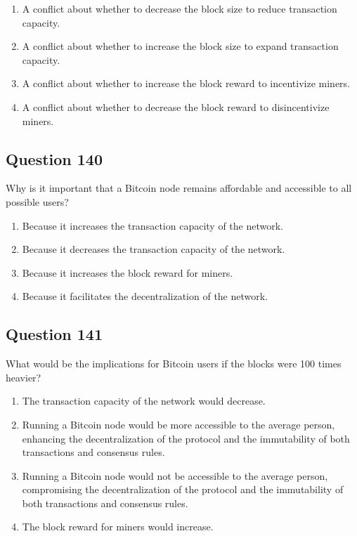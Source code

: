 \documentclass[12pt,a4paper]{article}
\begin{document}
\begin{enumerate}[label=\Alph*., leftmargin=*]
\item A conflict about whether to decrease the block size to reduce transaction capacity.
\item A conflict about whether to increase the block size to expand transaction capacity.
\item A conflict about whether to increase the block reward to incentivize miners.
\item A conflict about whether to decrease the block reward to disincentivize miners.
\end{enumerate}

\bigskip


\subsection*{Question 140}
Why is it important that a Bitcoin node remains affordable and accessible to all possible users?

\begin{enumerate}[label=\Alph*., leftmargin=*]
\item Because it increases the transaction capacity of the network.
\item Because it decreases the transaction capacity of the network.
\item Because it increases the block reward for miners.
\item Because it facilitates the decentralization of the network.
\end{enumerate}

\bigskip


\subsection*{Question 141}
What would be the implications for Bitcoin users if the blocks were 100 times heavier?

\begin{enumerate}[label=\Alph*., leftmargin=*]
\item The transaction capacity of the network would decrease.
\item Running a Bitcoin node would be more accessible to the average person, enhancing the decentralization of the protocol and the immutability of both transactions and consensus rules.
\item Running a Bitcoin node would not be accessible to the average person, compromising the decentralization of the protocol and the immutability of both transactions and consensus rules.
\item The block reward for miners would increase.
\end{enumerate}
\end{document}
